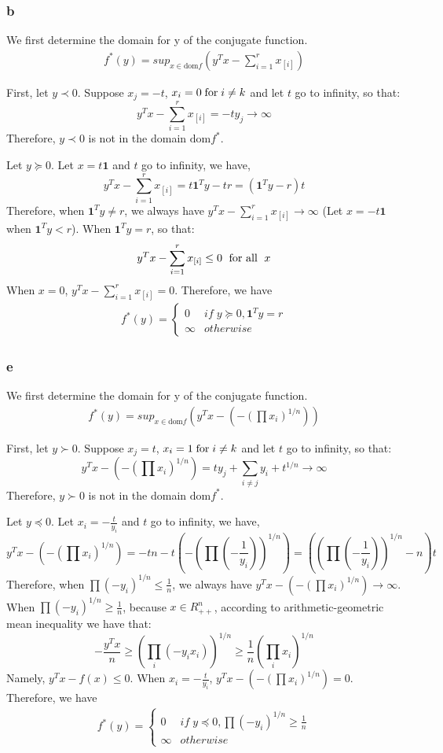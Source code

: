 \documentclass[10pt,a4paper]{article}
\begin{document}
\subsubsection{b}
We first determine the domain for y of the conjugate function.
\begin{align}
f^*(y) = sup_{x\in \text{dom}f}(y^Tx-\sum_{i=1}^{r}x_{[i]})
\end{align}

First, let $y\prec0$. Suppose $x_j=-t$, $x_i=0 \text{\;for\;} i \neq k$ and let $t$ go to infinity, so that:
$$
y^Tx-\sum_{i=1}^{r}x_{[i]}=-ty_j \rightarrow \infty
$$
Therefore, $y\prec0$ is not in the domain $\text{dom}f^*$.

Let $y\succeq0$. Let $x=t\mathbf{1}$ and $t$ go to infinity, we have,
$$
y^Tx-\sum_{i=1}^{r}x_{[i]}=t\mathbf{1}^Ty-tr= (\mathbf{1}^Ty-r)t
$$
Therefore, when $\mathbf{1}^Ty \neq r$, we always have $y^Tx-\sum_{i=1}^{r}x_{[i]}\rightarrow \infty$ (Let $x=-t\mathbf{1}$ when $\mathbf{1}^Ty<r$). When $\mathbf{1}^Ty=r$, so that:
$$
y^Tx-\sum_{i=1}^{r}x_{[i]}\leq 0 \text{\; for all \;}x
$$
When $x=0$, $y^Tx-\sum_{i=1}^{r}x_{[i]}=0$. Therefore, we have
\begin{align*}
f^*(y)=
\begin{cases}
0 & if\; y\succeq0, \mathbf{1}^Ty=r\\
\infty & otherwise
\end{cases}
\end{align*}


\subsubsection{e}
We first determine the domain for y of the conjugate function.
\begin{align}
f^*(y) = sup_{x\in \text{dom}f}(y^Tx-(-(\prod x_i)^{1/n}))
\end{align}

First, let $y\succ0$. Suppose $x_j=t$, $x_i=1 \text{\;for\;} i \neq k$ and let $t$ go to infinity, so that:
$$
y^Tx-(-(\prod x_i)^{1/n})=ty_j +\sum_{i\neq j}y_i+t^{1/n}\rightarrow \infty
$$
Therefore, $y\succ0$ is not in the domain $\text{dom}f^*$.

Let $y\preceq0$. Let $x_i=-\frac{t}{y_i}$ and $t$ go to infinity, we have,
$$
y^Tx-(-(\prod x_i)^{1/n})=-tn-t(-(\prod (-\frac{1}{y_i}))^{1/n})= ((\prod (-\frac{1}{y_i}))^{1/n}-n)t
$$
Therefore, when $\prod (-y_i)^{1/n} \leq \frac{1}{n}$, we always have $y^Tx-(-(\prod x_i)^{1/n})\rightarrow \infty$. When $\prod (-y_i)^{1/n} \geq \frac{1}{n}$, because $x\in R_{++}^n$, according to arithmetic-geometric mean inequality we have that:
$$
-\frac{y^Tx}{n}\geq (\prod_i(-y_ix_i))^{1/n}\geq\frac{1}{n}(\prod_i x_i)^{1/n}
$$
Namely, $y^Tx-f(x) \leq 0$. When $x_i=-\frac{t}{y_i}$, $y^Tx-(-(\prod x_i)^{1/n})=0$. Therefore, we have
\begin{align*}
f^*(y)=
\begin{cases}
0 & if\; y\preceq0, \prod (-y_i)^{1/n} \geq \frac{1}{n}\\
\infty & otherwise
\end{cases}
\end{align*}
\end{document}
